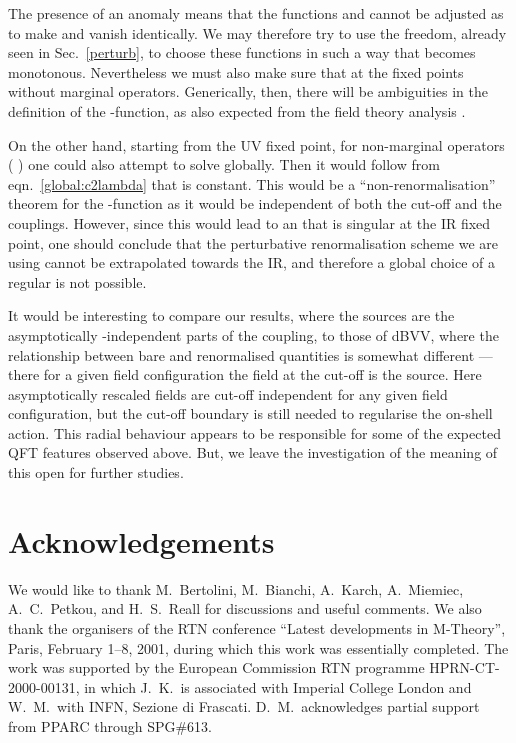 \documentclass[a4paper,12pt]{article}
\begin{document}
The presence of an anomaly means that the functions 
\coordHE{} and \myHighlight{$\Phi$}\coordHE{} cannot
be adjusted as to make \coordHE{} and \coordHE{} vanish identically. 
We may therefore try to use the freedom, already seen in 
Sec.~\ref{perturb}, to choose these
functions in such a way that \coordHE{} becomes monotonous. Nevertheless we
must also make sure that \coordHE{} at the fixed points without
marginal operators. 
Generically, then, there will be ambiguities in the definition of 
the \coordHE{}-function, as also expected from the field theory analysis 
\cite{Anselmi00a}.

On the other hand, starting from the UV fixed point, for non-marginal 
operators (\coordHE{} ) one could also attempt to solve \coordHE{}
globally. Then it would follow from eqn.\ \eqref{global:c2lambda} that 
\coordHE{} is constant. This would be a ``non-renormalisation'' theorem for
the \coordHE{}-function as it would be independent of both the cut-off and the 
couplings. 
However, since this would lead to an \coordHE{} that is singular at the
IR fixed point, one should conclude that the perturbative
renormalisation scheme we are using cannot be extrapolated towards the
IR, and therefore a global choice of a regular \coordHE{} is not possible.

It would be interesting to compare our results, where the sources are 
the asymptotically \coordHE{}-independent parts of the coupling, to those 
of  dBVV, where the relationship between bare and renormalised 
quantities is somewhat different \cite{deBoer00a}---there 
for a given field configuration the field at the 
cut-off is the source. Here asymptotically rescaled
fields are cut-off independent for any given field configuration, but 
the cut-off boundary is still needed to regularise the on-shell action. 
This radial behaviour appears to be responsible for some of the expected 
QFT features observed above. 
But, we leave the investigation of the meaning of this open for further
studies.



\section*{Acknowledgements}
We would like to thank M.~Bertolini, M.~Bianchi, A.~Karch, A.~Miemiec, 
A.~C.~Petkou, and H.~S.~Reall for discussions and useful comments. 
We also thank the 
organisers of the RTN conference ``Latest developments in M-Theory'', 
Paris, February 1--8, 2001, during which this work was essentially 
completed. 
The work was supported by the European Commission RTN programme
HPRN-CT-2000-00131, in which J.~K.\ is associated with Imperial
College London and W.~M.\ with INFN, Sezione di Frascati. D.~M.\
acknowledges partial support from PPARC through SPG\#613.
\end{document}
